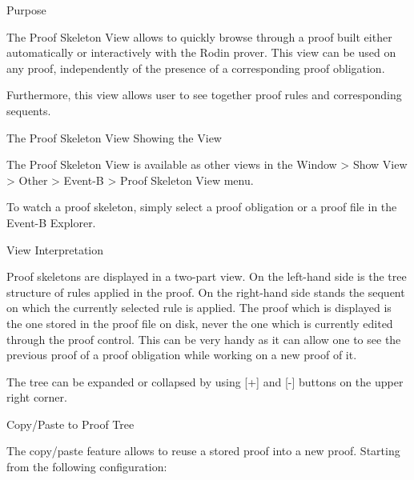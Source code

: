 Purpose

The Proof Skeleton View allows to quickly browse through a proof built either automatically or interactively with the Rodin prover. This view can be used on any proof, independently of the presence of a corresponding proof obligation.

Furthermore, this view allows user to see together proof rules and corresponding sequents.

The Proof Skeleton View
Showing the View

The Proof Skeleton View is available as other views in the Window > Show View > Other > Event-B > Proof Skeleton View menu.

To watch a proof skeleton, simply select a proof obligation or a proof file in the Event-B Explorer.

View Interpretation

Proof skeletons are displayed in a two-part view. On the left-hand side is the tree structure of rules applied in the proof. On the right-hand side stands the sequent on which the currently selected rule is applied. The proof which is displayed is the one stored in the proof file on disk, never the one which is currently edited through the proof control. This can be very handy as it can allow one to see the previous proof of a proof obligation while working on a new proof of it. 


The tree can be expanded or collapsed by using [+] and [-] buttons on the upper right corner.

Copy/Paste to Proof Tree

The copy/paste feature allows to reuse a stored proof into a new proof. Starting from the following configuration: 


